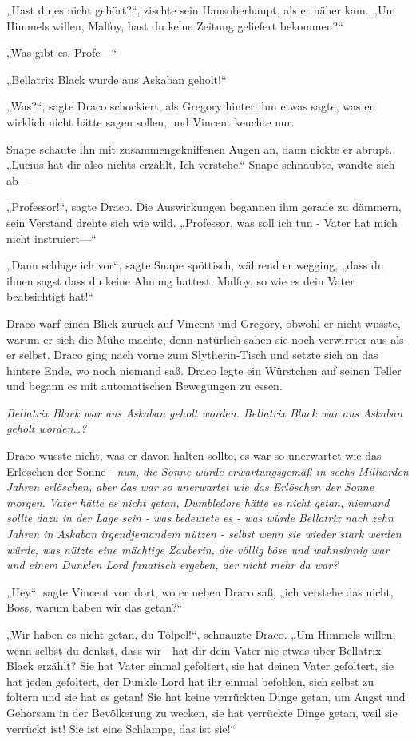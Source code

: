 {„Hast du es nicht gehört?“, zischte sein Hausoberhaupt, als er näher kam. „Um Himmels willen, Malfoy, hast du keine Zeitung geliefert bekommen?“

„Was gibt es, Profe—“

„Bellatrix Black wurde aus Askaban geholt!“

„Was?“, sagte Draco schockiert, als Gregory hinter ihm etwas sagte, was er wirklich nicht hätte sagen sollen, und Vincent keuchte nur.

Snape schaute ihn mit zusammengekniffenen Augen an, dann nickte er abrupt. „Lucius hat dir also nichts erzählt. Ich verstehe.“ Snape schnaubte, wandte sich ab—

„Professor!“, sagte Draco. Die Auswirkungen begannen ihm gerade zu dämmern, sein Verstand drehte sich wie wild. „Professor, was soll ich tun - Vater hat mich nicht instruiert—“

„Dann schlage ich vor“, sagte Snape spöttisch, während er wegging, „dass du ihnen sagst dass du keine Ahnung hattest, Malfoy, so wie es dein Vater beabsichtigt hat!“

Draco warf einen Blick zurück auf Vincent und Gregory, obwohl er nicht wusste, warum er sich die Mühe machte, denn natürlich sahen sie noch verwirrter aus als er selbst. Draco ging nach vorne zum Slytherin-Tisch und setzte sich an das hintere Ende, wo noch niemand saß. Draco legte ein Würstchen auf seinen Teller und begann es mit automatischen Bewegungen zu essen.

\emph{Bellatrix Black war aus Askaban geholt worden. Bellatrix Black war aus Askaban geholt worden…?}

Draco wusste nicht, was er davon halten sollte, es war so unerwartet wie das Erlöschen der Sonne - \emph{nun, die Sonne würde erwartungsgemäß in sechs Milliarden Jahren erlöschen, aber das war so unerwartet wie das Erlöschen der Sonne morgen.} \emph{Vater hätte es nicht getan, Dumbledore hätte es nicht getan, niemand sollte dazu in der Lage sein - was bedeutete es - was würde Bellatrix nach zehn Jahren in Askaban irgendjemandem nützen - selbst wenn sie wieder stark werden würde, was nützte eine mächtige Zauberin, die völlig böse und wahnsinnig war und einem Dunklen Lord fanatisch ergeben, der nicht mehr da war?}

„Hey“, sagte Vincent von dort, wo er neben Draco saß, „ich verstehe das nicht, Boss, warum haben wir das getan?“

„Wir haben es nicht getan, du Tölpel!“, schnauzte Draco. „Um Himmels willen, wenn selbst du denkst, dass wir - hat dir dein Vater nie etwas über Bellatrix Black erzählt? Sie hat Vater einmal gefoltert, sie hat deinen Vater gefoltert, sie hat jeden gefoltert, der Dunkle Lord hat ihr einmal befohlen, sich selbst zu foltern und sie hat es getan! Sie hat keine verrückten Dinge getan, um Angst und Gehorsam in der Bevölkerung zu wecken, sie hat verrückte Dinge getan, weil sie verrückt ist! Sie ist eine Schlampe, das ist sie!“

}
